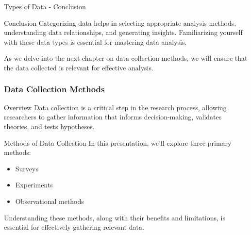 \documentclass[aspectratio=169]{beamer}
\begin{document}
\begin{frame}[fragile]{Types of Data - Conclusion}
    \begin{block}{Conclusion}
        Categorizing data helps in selecting appropriate analysis methods, understanding data relationships, and generating insights. Familiarizing yourself with these data types is essential for mastering data analysis.
    \end{block}
    As we delve into the next chapter on data collection methods, we will ensure that the data collected is relevant for effective analysis.
\end{frame}

\begin{frame}[fragile]
    \frametitle{Data Collection Methods}
    \begin{block}{Overview}
        Data collection is a critical step in the research process, allowing researchers to gather information that informs decision-making, validates theories, and tests hypotheses. 
    \end{block}
    \begin{block}{Methods of Data Collection}
        In this presentation, we’ll explore three primary methods: 
        \begin{itemize}
            \item Surveys
            \item Experiments
            \item Observational methods
        \end{itemize}
        Understanding these methods, along with their benefits and limitations, is essential for effectively gathering relevant data.
    \end{block}
\end{frame}
\end{document}
